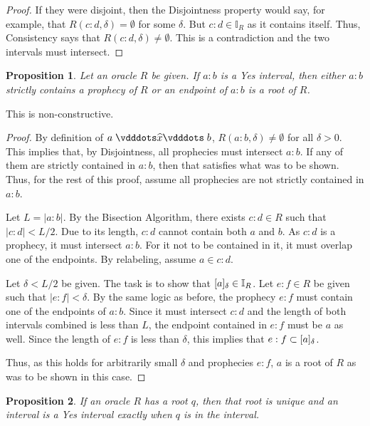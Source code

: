 \documentclass[12pt]{article}
\newtheorem{proposition}{Proposition}[section]
\begin{document}
\begin{proof}
    If they were disjoint, then the Disjointness property would say, for example, that $R(c:d, \delta)= \emptyset$ for some $\delta$. But $c:d \in \mathbb{I}_R$ as it contains itself. Thus, Consistency says that $R(c:d, \delta) \neq \emptyset$. This is a contradiction and the two intervals must intersect. 
\end{proof}

\begin{proposition}\label{os:yescat}
    Let an oracle $R$ be given. If $a:b$ is a Yes interval, then either $a:b$ strictly contains a prophecy of $R$ or an endpoint of $a:b$ is a root of $R$. 
\end{proposition}

This is non-constructive. 

\begin{proof}
    By definition of $a \xora b$, $R(a:b, \delta) \neq \emptyset$ for all $\delta > 0$. This implies that, by Disjointness, all prophecies must intersect $a:b$. If any of them are strictly contained in $a:b$, then that satisfies what was to be shown. Thus, for the rest of this proof, assume all prophecies are not strictly contained in $a:b$.

    Let $L = |a:b|$. By the Bisection Algorithm, there exists $c:d \in R$ such that $|c:d| < L/2$. Due to its length, $c:d$ cannot contain both $a$ and $b$. As $c:d$ is a prophecy, it must intersect $a:b$. For it not to be contained in it, it must overlap one of the endpoints. By relabeling, assume $a \in c:d$.
    
    Let $\delta < L/2$ be given. The task is to show that $[a]_{\delta} \in \mathbb{I}_R$. Let $e:f \in R$ be given such that $|e:f| < \delta$. By the same logic as before, the prophecy $e:f$ must contain one of the endpoints of $a:b$. Since it must intersect $c:d$ and the length of both intervals combined is less than $L$, the endpoint contained in $e:f$ must be $a$ as well. Since the length of $e:f$ is less than $\delta$, this implies that $e:f \subset [a]_{\delta}$.

    Thus, as this holds for arbitrarily small $\delta$ and prophecies $e:f$, $a$ is a root of $R$ as was to be shown in this case. 
\end{proof}

\begin{proposition}\label{os:singular}
    If an oracle $R$ has a root $q$, then that root is unique and an interval is a Yes interval exactly when $q$ is in the interval.
\end{proposition}
\end{document}
